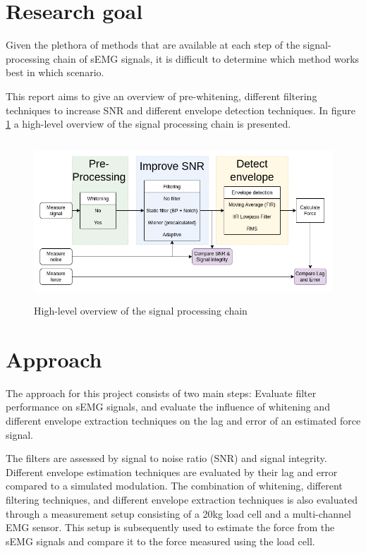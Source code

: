 \section{Research goal}
Given the plethora of methods that are available at each step of the signal-processing chain of sEMG signals, it is difficult to determine which method works best in which scenario.

This report aims to give an overview of pre-whitening, different filtering techniques to increase SNR and different envelope detection techniques. In figure \ref{fig:global_thesis_flowchart} a high-level overview of the signal processing chain is presented. 

\begin{figure}[h!t]
	\begin{center}
		\includegraphics[height=60mm]{images/global_thesis_flowchart.png}
	\end{center}
	\caption{High-level overview of the signal processing chain}
	\label{fig:global_thesis_flowchart}
\end{figure}


\section{Approach}
The approach for this project consists of two main steps: Evaluate filter performance on sEMG signals, and evaluate the influence of whitening and different envelope extraction techniques on the lag and error of an estimated force signal.

The filters are assessed by signal to noise ratio (SNR) and signal integrity. Different envelope estimation techniques are evaluated by their lag and error compared to a simulated modulation. The combination of whitening, different filtering techniques, and different envelope extraction techniques is also evaluated through a measurement setup consisting of a 20kg load cell and a multi-channel EMG sensor. This setup is subsequently used to estimate the force from the sEMG signals and compare it to the force measured using the load cell.